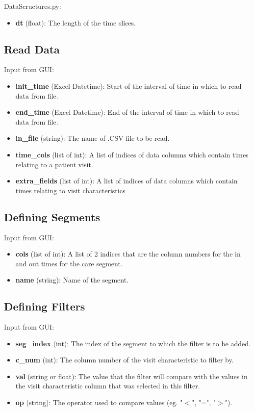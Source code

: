 \documentclass{article}
\begin{document}
DataScructures.py:

\begin{itemize}
	\item \textbf{dt} (float): The length of the time slices.
\end{itemize}

\subsection*{Read Data}
Input from GUI:

\begin{itemize}
	\item \textbf{init\_time} (Excel Datetime): Start of the interval of time in which to read data from file.
	\item \textbf{end\_time} (Excel Datetime): End of the interval of time in which to read data from file.
	\item \textbf{in\_file} (string): The name of .CSV file to be read.
	\item \textbf{time\_cols} (list of int): A list of indices of data columns which contain times relating to a patient visit.
	\item \textbf{extra\_fields} (list of int): A list of indices of data columns which contain times relating to visit characteristics
\end{itemize}

\subsection*{Defining Segments}
Input from GUI:

\begin{itemize}
	\item \textbf{cols} (list of int): A list of 2 indices that are the column numbers for the in and out times for the care segment.
	\item \textbf{name} (string): Name of the segment.
\end{itemize}

\subsection*{Defining Filters}
Input from GUI:

\begin{itemize}
	\item \textbf{seg\_index} (int): The index of the segment to which the filter is to be added.
	\item \textbf{c\_num} (int): The column number of the visit characteristic to filter by.
	\item \textbf{val} (string or float): The value that the filter will compare with the values in the visit characteristic column that was selected in this filter.
	\item \textbf{op} (string): The operator used to compare values (eg. "$<$", "=", "$>$").
\end{itemize}
\end{document}
